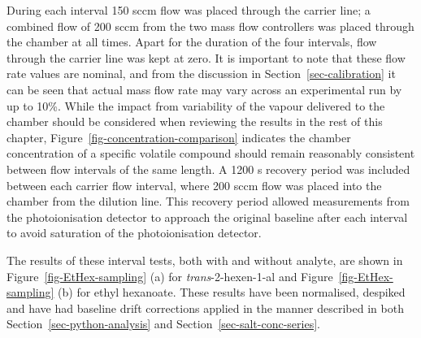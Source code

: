 \documentclass[
  a4paper,
]{scrbook}
\begin{document}
During each interval 150 sccm flow was placed through the carrier line;
a combined flow of 200 sccm from the two mass flow controllers was
placed through the chamber at all times. Apart for the duration of the
four intervals, flow through the carrier line was kept at zero. It is
important to note that these flow rate values are nominal, and from the
discussion in Section~\ref{sec-calibration} it can be seen that actual
mass flow rate may vary across an experimental run by up to 10\%. While
the impact from variability of the vapour delivered to the chamber
should be considered when reviewing the results in the rest of this
chapter, Figure~\ref{fig-concentration-comparison} indicates the chamber
concentration of a specific volatile compound should remain reasonably
consistent between flow intervals of the same length. A 1200 s recovery
period was included between each carrier flow interval, where 200 sccm
flow was placed into the chamber from the dilution line. This recovery
period allowed measurements from the photoionisation detector to
approach the original baseline after each interval to avoid saturation
of the photoionisation detector.

The results of these interval tests, both with and without analyte, are
shown in Figure~\ref{fig-EtHex-sampling} (a) for
\emph{trans}-2-hexen-1-al and Figure~\ref{fig-EtHex-sampling} (b) for
ethyl hexanoate. These results have been normalised, despiked and have
had baseline drift corrections applied in the manner described in both
Section~\ref{sec-python-analysis} and
Section~\ref{sec-salt-conc-series}.
\end{document}

